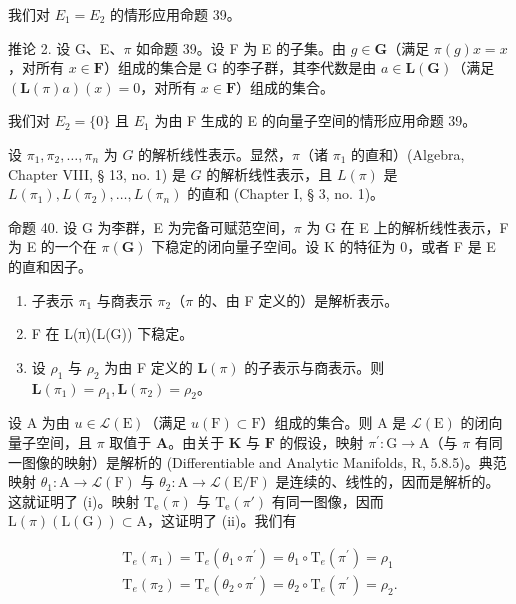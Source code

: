 我们对 \(E_{1} = E_{2}\) 的情形应用命题 39。

推论 2. 设 G、E、\(\pi\) 如命题 39。设 F 为 E 的子集。由 \(g \in \mathbf{G}\)（满足 \(\pi(g)x = x\)，对所有 \(x \in \mathbf{F}\)）组成的集合是 G 的李子群，其李代数是由 \(a \in \mathbf{L}(\mathbf{G})\)（满足 \((\mathbf{L}(\pi)a)(x) = 0\)，对所有 \(x \in \mathbf{F}\)）组成的集合。

我们对 \(E_{2}=\{0\}\) 且 \(E_{1}\) 为由 F 生成的 E 的向量子空间的情形应用命题 39。

设 \(\pi_1, \pi_2, \ldots, \pi_n\) 为 \(G\) 的解析线性表示。显然，\(\pi\)（诸 \(\pi_1\) 的直和）(Algebra, Chapter VIII, § 13, no. 1) 是 \(G\) 的解析线性表示，且 \(L(\pi)\) 是 \(L(\pi_1), L(\pi_2), \ldots, L(\pi_n)\) 的直和 (Chapter I, § 3, no. 1)。

命题 40. 设 G 为李群，E 为完备可赋范空间，\(\pi\) 为 G 在 E 上的解析线性表示，F 为 E 的一个在 \(\pi(\mathbf{G})\) 下稳定的闭向量子空间。设 K 的特征为 0，或者 F 是 E 的直和因子。

\begin{enumerate}
\def\labelenumi{(\roman{enumi})}
\item
  子表示 \(\pi_1\) 与商表示 \(\pi_2\)（\(\pi\) 的、由 F 定义的）是解析表示。
\item
  F 在 L(π)(L(G)) 下稳定。
\item
  设 \(\rho_{1}\) 与 \(\rho_{2}\) 为由 F 定义的 \(\mathbf{L}(\pi)\) 的子表示与商表示。则 \(\mathbf{L}(\pi_1) = \rho_1, \mathbf{L}(\pi_2) = \rho_2\)。
\end{enumerate}

设 \(\mathrm{A}\) 为由 \(u\in \mathcal{L}(\mathrm{E})\)（满足 \(u(\mathrm{F})\subset \mathrm{F}\)）组成的集合。则 \(\mathrm{A}\) 是 \(\mathcal{L}(\mathrm{E})\) 的闭向量子空间，且 \(\pi\) 取值于 \(\mathbf{A}\)。由关于 \(\mathbf{K}\) 与 \(\mathbf{F}\) 的假设，映射 \(\pi^{\prime}\colon \mathrm{G}\to \mathrm{A}\)（与 \(\pi\) 有同一图像的映射）是解析的 (Differentiable and Analytic Manifolds, R, 5.8.5)。典范映射 \(\theta_{1}\colon \mathrm{A}\to \mathcal{L}(\mathrm{F})\) 与 \(\theta_{2}\colon \mathrm{A}\to \mathcal{L}(\mathrm{E / F})\) 是连续的、线性的，因而是解析的。这就证明了 (i)。映射 \(\mathrm{T_e}(\pi)\) 与 \(\mathrm{T_e}(\pi ')\) 有同一图像，因而 \(\mathrm{L}(\pi)(\mathrm{L}(\mathrm{G}))\subset \mathrm{A}\)，这证明了 (ii)。我们有

\[
\begin{array}{l} \mathrm{T} _ {e} (\pi_ {1}) = \mathrm{T} _ {e} (\theta_ {1} \circ \pi^ {\prime}) = \theta_ {1} \circ \mathrm{T} _ {e} (\pi^ {\prime}) = \rho_ {1} \\ \mathrm{T} _ {e} (\pi_ {2}) = \mathrm{T} _ {e} (\theta_ {2} \circ \pi^ {\prime}) = \theta_ {2} \circ \mathrm{T} _ {e} (\pi^ {\prime}) = \rho_ {2}. \end{array}
\]

